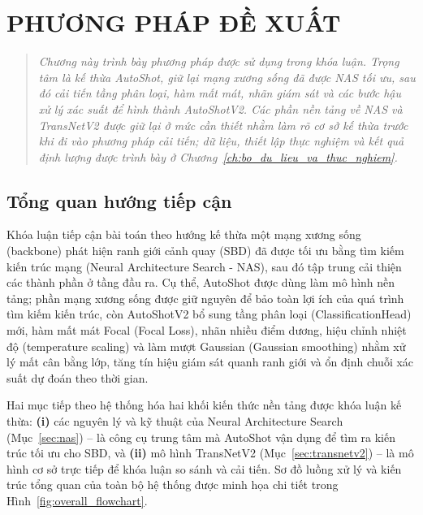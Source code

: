 \chapter{PHƯƠNG PHÁP ĐỀ XUẤT}
\label{ch:phuong_phap_de_xuat}

\vspace{-1.5cm}

\begin{quotation}
    \noindent
    \small\textit{
        Chương này trình bày phương pháp được sử dụng trong khóa luận. Trọng tâm là kế thừa AutoShot, giữ lại mạng xương sống đã được NAS tối ưu, sau đó cải tiến tầng phân loại, hàm mất mát, nhãn giám sát và các bước hậu xử lý xác suất để hình thành AutoShotV2. Các phần nền tảng về NAS và TransNetV2 được giữ lại ở mức cần thiết nhằm làm rõ cơ sở kế thừa trước khi đi vào phương pháp cải tiến; dữ liệu, thiết lập thực nghiệm và kết quả định lượng được trình bày ở Chương~\ref{ch:bo_du_lieu_va_thuc_nghiem}.
    }
\end{quotation}

\vspace{1em}


\section{Tổng quan hướng tiếp cận}
Khóa luận tiếp cận bài toán theo hướng kế thừa một mạng xương sống (backbone) phát hiện ranh giới cảnh quay (SBD) đã được tối ưu bằng tìm kiếm kiến trúc mạng (Neural Architecture Search - NAS), sau đó tập trung cải thiện các thành phần ở tầng đầu ra. Cụ thể, AutoShot được dùng làm mô hình nền tảng; phần mạng xương sống được giữ nguyên để bảo toàn lợi ích của quá trình tìm kiếm kiến trúc, còn AutoShotV2 bổ sung tầng phân loại (ClassificationHead) mới, hàm mất mát Focal (Focal Loss), nhãn nhiều điểm dương, hiệu chỉnh nhiệt độ (temperature scaling) và làm mượt Gaussian (Gaussian smoothing) nhằm xử lý mất cân bằng lớp, tăng tín hiệu giám sát quanh ranh giới và ổn định chuỗi xác suất dự đoán theo thời gian.

\noindent
Hai mục tiếp theo hệ thống hóa hai khối kiến thức nền tảng được khóa luận kế thừa: \textbf{(i)} các nguyên lý và kỹ thuật của Neural Architecture Search (Mục~\ref{sec:nas}) -- là công cụ trung tâm mà AutoShot vận dụng để tìm ra kiến trúc tối ưu cho SBD, và \textbf{(ii)} mô hình TransNetV2 (Mục~\ref{sec:transnetv2}) -- là mô hình cơ sở trực tiếp để khóa luận so sánh và cải tiến. Sơ đồ luồng xử lý và kiến trúc tổng quan của toàn bộ hệ thống được minh họa chi tiết trong Hình~\ref{fig:overall_flowchart}.

